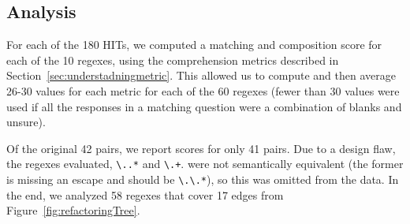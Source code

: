 \subsection{Analysis}
For each of the 180 HITs, we computed a matching and composition score for each of the 10 regexes, using the comprehension metrics described in Section~\ref{sec:understadningmetric}. This allowed us to compute and then average 26-30 values for each metric  for each of the 60 regexes (fewer than 30 values were used if all the responses in a matching question were a combination of blanks and unsure). %


Of the original 42 pairs, we report scores for only 41 pairs. Due to a design flaw, the regexes evaluated, \verb!\..*! and \verb!\.+!. were not semantically equivalent (the former is missing an escape and should be \verb!\.\.*!), so this was omitted from the data. In the end, we analyzed 58 regexes that cover  17 edges from Figure~\ref{fig:refactoringTree}.


